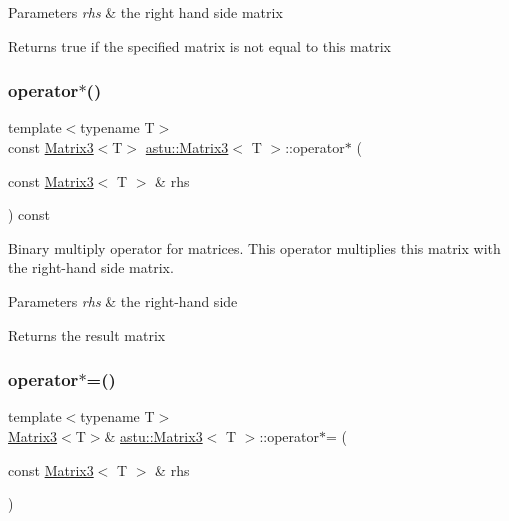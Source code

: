 \begin{DoxyParams}{Parameters}
{\em rhs} & the right hand side matrix \\
\hline
\end{DoxyParams}
\begin{DoxyReturn}{Returns}
{\ttfamily true} if the specified matrix is not equal to this matrix 
\end{DoxyReturn}
\mbox{\label{classastu_1_1Matrix3_a2fef9723742fe842623d1a0309db45ab}} 
\subsubsection{\texorpdfstring{operator$\ast$()}{operator*()}}
{\footnotesize\ttfamily template$<$typename T$>$ \\
const \hyperlink{classastu_1_1Matrix3}{Matrix3}$<$T$>$ \hyperlink{classastu_1_1Matrix3}{astu\+::\+Matrix3}$<$ T $>$\+::operator$\ast$ (\begin{DoxyParamCaption}\item[{const \hyperlink{classastu_1_1Matrix3}{Matrix3}$<$ T $>$ \&}]{rhs }\end{DoxyParamCaption}) const\hspace{0.3cm}{\ttfamily [inline]}}

Binary multiply operator for matrices. This operator multiplies this matrix with the right-\/hand side matrix.


\begin{DoxyParams}{Parameters}
{\em rhs} & the right-\/hand side \\
\hline
\end{DoxyParams}
\begin{DoxyReturn}{Returns}
the result matrix 
\end{DoxyReturn}
\mbox{\label{classastu_1_1Matrix3_ab3637ea5a1f5fe0cb68264475a7814e8}} 
\subsubsection{\texorpdfstring{operator$\ast$=()}{operator*=()}}
{\footnotesize\ttfamily template$<$typename T$>$ \\
\hyperlink{classastu_1_1Matrix3}{Matrix3}$<$T$>$\& \hyperlink{classastu_1_1Matrix3}{astu\+::\+Matrix3}$<$ T $>$\+::operator$\ast$= (\begin{DoxyParamCaption}\item[{const \hyperlink{classastu_1_1Matrix3}{Matrix3}$<$ T $>$ \&}]{rhs }\end{DoxyParamCaption})\hspace{0.3cm}{\ttfamily [inline]}}

